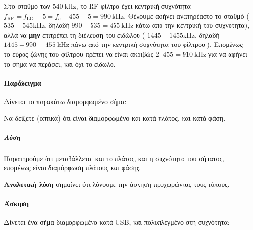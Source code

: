 \documentclass[11pt,a4paper,notitlepage,fleqn,final]{article}
\begin{document}
\begin{enumgreekparen}
	Στο σταθμό των \( \SI{540}{\kilo\hertz} \), το RF φίλτρο έχει κεντρική συχνότητα
	\( f_{\mathrm{RF}} = f_{\mathrm{LO}} -5 = f_c + 455 - 5 = \SI{990}{\kilo\hertz}  \).
	Θέλουμε αφήνει ανεπηρέαστο το σταθμό (\( 535-545 \si{\kilo\hertz} \), δηλαδή \( 990-535 = \SI{455}{\kilo\hertz} \)
	κάτω από την κεντρική του συχνότητα), αλλά να \textbf{μην} επιτρέπει τη διέλευση του ειδώλου (%
	\( 1445-1455 \si{\kilo\hertz} \), δηλαδή \( 1445-990 = \SI{455}{\kilo\hertz} \)
	πάνω από την κεντρική συχνότητα του φίλτρου
	). Επομένως το εύρος ζώνης του φίλτρου πρέπει να είναι ακριβώς \( 2\cdot 455 = \SI{910}{\kilo\hertz} \)
	για να αφήνει το σήμα να περάσει, και όχι το είδωλο.
\end{enumgreekparen}


\paragraph{Παράδειγμα}
Δίνεται το παρακάτω διαμορφωμένο σήμα:


Να δείξετε (οπτικά) ότι είναι διαμορφωμένο και κατά πλάτος, και κατά φάση.
\subparagraph{Λύση}
Παρατηρούμε ότι μεταβάλλεται και το πλάτος, και η συχνότητα του σήματος, επομένως
είναι διαμόρφωση πλάτους και φάσης.

\begin{attnbox}{}
	\textbf{Αναλυτική λύση} σημαίνει ότι λύνουμε την άσκηση προχωρώντας τους τύπους.
\end{attnbox}

\paragraph{Άσκηση}
Δίνεται ένα σήμα διαμορφωμένο κατά USB, και πολυπλεγμένο στη συχνότητα:
\end{document}
